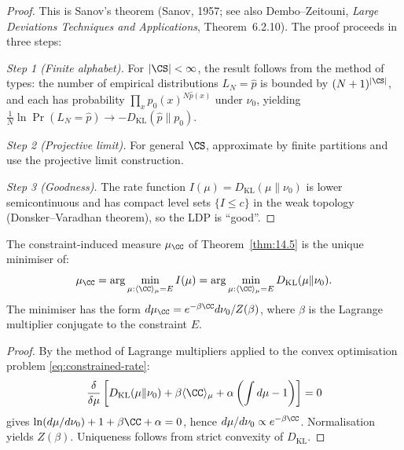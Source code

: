 \begin{proof}
This is Sanov's theorem (Sanov, 1957; see also Dembo--Zeitouni,
\emph{Large Deviations Techniques and Applications}, Theorem~6.2.10).
The proof proceeds in three steps:

\emph{Step 1 (Finite alphabet).} For $|\CS| < \infty$, the result
follows from the method of types: the number of empirical distributions
$L_N = \hat{p}$ is bounded by $(N+1)^{|\CS|}$, and each has probability
$\prod_x p_0(x)^{N\hat{p}(x)}$ under $\nu_0$, yielding
$\frac{1}{N}\ln\Pr(L_N = \hat{p}) \to -D_{\mathrm{KL}}(\hat{p}\|p_0)$.

\emph{Step 2 (Projective limit).} For general $\CS$, approximate by
finite partitions and use the projective limit construction.

\emph{Step 3 (Goodness).} The rate function $I(\mu) =
D_{\mathrm{KL}}(\mu \| \nu_0)$ is lower semicontinuous and has
compact level sets $\{I \leq c\}$ in the weak topology (Donsker--Varadhan
theorem), so the LDP is ``good''.
\end{proof}

\begin{corollary}
\label{cor:15.4}
The constraint-induced measure $\mu_{\CC}$ of Theorem~\ref{thm:14.5}
is the unique minimiser of:
\begin{equation}\label{eq:constrained-rate}
  \mu_{\CC} = \arg\min_{\mu : \langle\CC\rangle_\mu = E}
  I(\mu) = \arg\min_{\mu : \langle\CC\rangle_\mu = E}
  D_{\mathrm{KL}}(\mu \| \nu_0).
\end{equation}
The minimiser has the form
$d\mu_{\CC} = e^{-\beta\CC} d\nu_0 / Z(\beta)$, where $\beta$ is
the Lagrange multiplier conjugate to the constraint $E$.
\end{corollary}

\begin{proof}
By the method of Lagrange multipliers applied to the convex
optimisation problem \eqref{eq:constrained-rate}:
\[
  \frac{\delta}{\delta\mu}\left[D_{\mathrm{KL}}(\mu \| \nu_0)
  + \beta\langle\CC\rangle_\mu
  + \alpha\left(\int d\mu - 1\right)\right] = 0
\]
gives $\ln(d\mu/d\nu_0) + 1 + \beta\CC + \alpha = 0$, hence
$d\mu/d\nu_0 \propto e^{-\beta\CC}$.  Normalisation yields $Z(\beta)$.
Uniqueness follows from strict convexity of $D_{\mathrm{KL}}$.
\end{proof}

